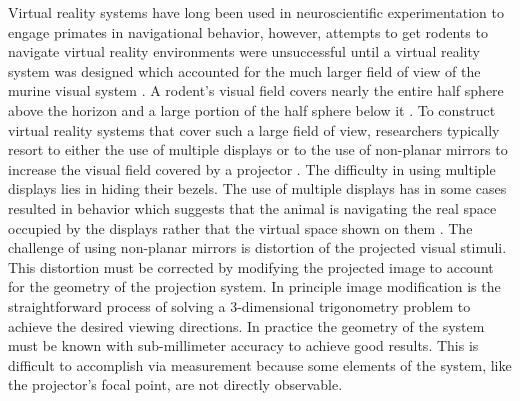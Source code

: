 \documentclass[10pt,letterpaper]{article}
\begin{document}
Virtual reality systems have long been used in neuroscientific experimentation
to engage primates in navigational behavior, however, attempts to get rodents
to navigate virtual reality environments were unsuccessful until a virtual
reality system was designed which accounted for the much larger field of view
of the murine visual system \cite{holscher2005rats, keller2012sensorimotor,
schmidt2013cellular, ayaz2013locomotion, saleem2013integration,
aronov2014engagement, rickgauer2014simultaneous, aghajan2015impaired}.  A
rodent’s visual field covers nearly the entire half sphere above the horizon
and a large portion of the half sphere below it \cite{hughes1977topography,
wagor1980retinotopic, schuett2002mapping, wang2007area}.  To construct virtual
reality systems that cover such a large field of view, researchers typically
resort to either the use of multiple displays \cite{keller2012sensorimotor,
ayaz2013locomotion, saleem2013integration} or to the use of non-planar mirrors
to increase the visual field covered by a projector
\cite{harvey2009intracellular, schmidt2013cellular, aronov2014engagement}.  The
difficulty in using multiple displays lies in hiding their bezels. The use of
multiple displays has in some cases resulted in behavior which suggests that
the animal is navigating the real space occupied by the displays rather that
the virtual space shown on them \cite{holscher2005rats}.  The challenge of
using non-planar mirrors is distortion of the projected visual stimuli. This
distortion must be corrected by modifying the projected image to account for
the geometry of the projection system.  In principle image modification is the
straightforward process of solving a 3-dimensional trigonometry problem to
achieve the desired viewing directions. In practice the geometry of the system
must be known with sub-millimeter accuracy to achieve good results.  This is
difficult to accomplish via measurement because some elements of the system,
like the projector's focal point, are not directly observable.  
\end{document}
